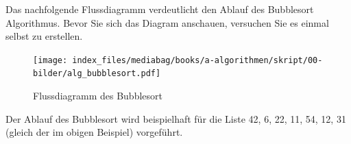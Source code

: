 \documentclass[
  letterpaper,
  DIV=11,
  numbers=noendperiod]{scrreprt}
\begin{document}
Das nachfolgende Flussdiagramm verdeutlicht den Ablauf des Bubblesort
Algorithmus. Bevor Sie sich das Diagram anschauen, versuchen Sie es
einmal selbst zu erstellen.

\begin{tcolorbox}[enhanced jigsaw, left=2mm, leftrule=.75mm, bottomrule=.15mm, title=\textcolor{quarto-callout-caution-color}{\faFire}\hspace{0.5em}{Flussdiagramm: Bubblesort}, colback=white, arc=.35mm, breakable, titlerule=0mm, bottomtitle=1mm, colbacktitle=quarto-callout-caution-color!10!white, toprule=.15mm, opacityback=0, coltitle=black, rightrule=.15mm, opacitybacktitle=0.6, toptitle=1mm, colframe=quarto-callout-caution-color-frame]

\begin{figure}[H]

{\centering \texttt{[image: index\_files/mediabag/books/a-algorithmen/skript/00-bilder/alg\_bubblesort.pdf]}

}

\caption{Flussdiagramm des Bubblesort}

\end{figure}%

\end{tcolorbox}

Der Ablauf des Bubblesort wird beispielhaft für die Liste 42, 6, 22, 11,
54, 12, 31 (gleich der im obigen Beispiel) vorgeführt.
\end{document}
